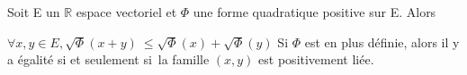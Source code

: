 %
%
%
%
%
%
%
%
%
%
%
%
%
\begin{thm}
	 Soit E un $\mathbb{R}$ espace vectoriel
et $\Phi$ une forme quadratique positive sur E. Alors

$\forall x,y \in E, \sqrt\Phi(x + y)~
\leq\sqrt\Phi(x) + \sqrt\Phi(y)$
%
Si $\Phi$ est en plus définie, alors il y a égalité si et seulement si~la
famille $(x,y)$ est positivement liée.
\end{thm}
